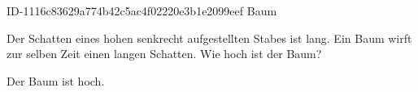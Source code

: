 \begin{exercise}
      {ID-1116c83629a774b42c5ac4f02220e3b1e2099eef}
      {Baum}
  \ifproblem\problem\par
    Der Schatten eines  hohen senkrecht aufgestellten Stabes ist
     lang. Ein Baum wirft zur selben Zeit einen 
    langen Schatten. Wie hoch ist der Baum?
  \fi
  \ifoutcome\outcome\par
    Der Baum ist  hoch.
  \fi
\end{exercise}

